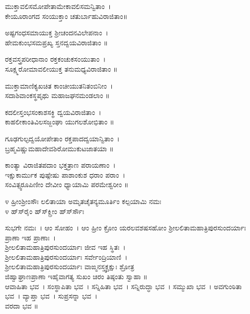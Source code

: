 ಮುಕ್ತಾವಲಿಸಮೋಪೇತಾಮೇಕಾವಲಿಸಮನ್ವಿತಾಂ~।\\
ಕೇಯೂರಾಂಗದ ಸಂಯುಕ್ತಾಂ ಚತುರ್ಬಾಹುವಿರಾಜಿತಾಂ॥

ಅಷ್ಟಗಂಧಸಮಾಯುಕ್ತ ಶ್ರೀಚಂದನವಿಲೇಪನಾಂ~।\\
ಹೇಮಕುಂಭಸಮಪ್ರಖ್ಯ ಸ್ತನದ್ವಯವಿರಾಜಿತಾಂ ॥

ರಕ್ತವಸ್ತ್ರಪರೀಧಾನಾಂ ರಕ್ತಕಂಚುಕಸಂಯುತಾಂ~।\\
ಸೂಕ್ಷ್ಮರೋಮಾವಲೀಯುಕ್ತ ತನುಮಧ್ಯವಿರಾಜಿತಾಂ ॥

ಮುಕ್ತಾಮಾಣಿಕ್ಯಖಚಿತ ಕಾಂಚೀಯುತನಿತಂಬಿನೀಂ~।\\
ಸದಾಶಿವಾಂಕಸ್ಥಪೃಥು ಮಹಾಜಘನಮಂಡಲಾಂ ॥

ಕದಲೀಸ್ತಂಭಸಂಕಾಶಸಕ್ಥಿ ದ್ವಯವಿರಾಜಿತಾಂ~।\\
ಕಾಹಲೀಕಾಂತಿವಿಲಸಜ್ಜಂಘಾ ಯುಗಲಶೋಭಿತಾಂ ॥

ಗೂಢಗುಲ್ಫದ್ವಯೋಪೇತಾಂ ರಕ್ತಪಾದದ್ವಯಾನ್ವಿತಾಂ~।\\
ಬ್ರಹ್ಮವಿಷ್ಣುಮಹಾದೇವಶಿರೋಮುಕುಟಜಾತಯಾ ॥

ಕಾಂತ್ಯಾ ವಿರಾಜಿತಪದಾಂ ಭಕ್ತತ್ರಾಣ ಪರಾಯಣಾಂ~।\\
ಇಕ್ಷುಕಾರ್ಮುಕ ಪುಷ್ಪೇಷು ಪಾಶಾಂಕುಶ ಧರಾಂ ಪರಾಂ~।\\
ಸಂವಿತ್ಸ್ವರೂಪಿಣೀಂ ದೇವೀಂ ಧ್ಯಾಯಾಮಿ ಪರಮೇಶ್ವರೀಂ ॥

೪ ಹ್ರೀಂಶ್ರೀಂಸೌಃ ಲಲಿತಾಯಾ ಅಮೃತಚೈತನ್ಯಮೂರ್ತಿಂ ಕಲ್ಪಯಾಮಿ ನಮಃ\\
೪ ಹ್‌ಸ್‌ರೈಂ ಹ್‌ಸ್‌ಕ್ಲ್ರೀಂ ಹ್‌ಸ್‌ರ್ಸೌಃ\\

ಸುಭಗೇ ನಮಃ~। ಆಂ ಸೋಹಂ~। ಆಂ ಹ್ರೀಂ ಕ್ರೋಂ ಯರಲವಶಷಸಹೋಂ ಶ್ರೀಲಲಿತಾಮಹಾತ್ರಿಪುರಸುಂದರ್ಯಾಃ ಪ್ರಾಣಾ ಇಹ ಪ್ರಾಣಾಃ~।\\ ಶ್ರೀಲಲಿತಾಮಹಾತ್ರಿಪುರಸುಂದರ್ಯಾಃ ಜೀವ ಇಹ ಸ್ಥಿತಃ~।\\ ಶ್ರೀಲಲಿತಾಮಹಾತ್ರಿಪುರಸುಂದರ್ಯಾಃ ಸರ್ವೇಂದ್ರಿಯಾಣಿ~।\\ಶ್ರೀಲಲಿತಾಮಹಾತ್ರಿಪುರಸುಂದರ್ಯಾಃ ವಾಙ್ಮನಸ್ತ್ವಕ್ಚಕ್ಷುಃ ಶ್ರೋತ್ರ\\ಜಿಹ್ವಾಘ್ರಾಣಪ್ರಾಣಾ ಇಹೈವಾಗತ್ಯ ಸುಖಂ ಚಿರಂ ತಿಷ್ಠಂತು ಸ್ವಾಹಾ ॥\\ಆವಾಹಿತಾ ಭವ~। ಸಂಸ್ಥಾಪಿತಾ ಭವ~। ಸನ್ನಿಹಿತಾ ಭವ~। ಸನ್ನಿರುದ್ಧಾ ಭವ~। ಸಮ್ಮುಖಾ ಭವ~। ಅವಗುಂಠಿತಾ ಭವ~। ವ್ಯಾಪ್ತಾ ಭವ~। ಸುಪ್ರಸನ್ನಾ ಭವ~।\\ ವರದಾ ಭವ ॥


